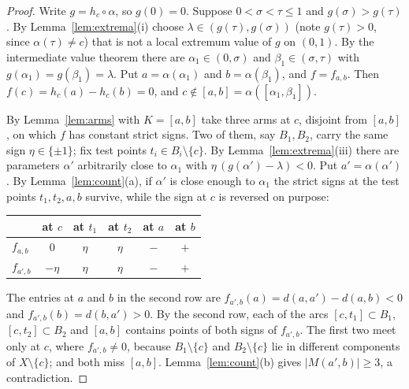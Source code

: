 \documentclass[11pt]{amsart}
\theoremstyle{definition}
\theoremstyle{remark}
\newcommand{\M}{M}
\begin{document}
\begin{proof}
Write $g=h_c\circ\alpha$, so $g(0)=0$. Suppose $0<\sigma<\tau\le1$ and $g(\sigma)>g(\tau)$. By Lemma~\ref{lem:extrema}(i) choose $\lambda\in(g(\tau),g(\sigma))$ (note $g(\tau)>0$, since $\alpha(\tau)\ne c$) that is not a local extremum value of $g$ on $(0,1)$. By the intermediate value theorem there are $\alpha_1\in(0,\sigma)$ and $\beta_1\in(\sigma,\tau)$ with $g(\alpha_1)=g(\beta_1)=\lambda$. Put $a=\alpha(\alpha_1)$ and $b=\alpha(\beta_1)$, and $f=f_{a,b}$. Then $f(c)=h_c(a)-h_c(b)=0$, and $c\notin[a,b]=\alpha([\alpha_1,\beta_1])$.

By Lemma~\ref{lem:arms} with $K=[a,b]$ take three arms at $c$, disjoint from $[a,b]$, on which $f$ has constant strict signs. Two of them, say $B_1,B_2$, carry the same sign $\eta\in\{\pm1\}$; fix test points $t_i\in B_i\setminus\{c\}$. By Lemma~\ref{lem:extrema}(iii) there are parameters $\alpha'$ arbitrarily close to $\alpha_1$ with $\eta\,(g(\alpha')-\lambda)<0$. Put $a'=\alpha(\alpha')$. By Lemma~\ref{lem:count}(a), if $\alpha'$ is close enough to $\alpha_1$ the strict signs at the test points $t_1,t_2,a,b$ survive, while the sign at $c$ is reversed on purpose:
\begin{center}
\small
\begin{tabular}{@{}lccccc@{}}
\toprule
 & at $c$ & at $t_1$ & at $t_2$ & at $a$ & at $b$\\
\midrule
$f_{a,b}$ & $0$ & $\eta$ & $\eta$ & $-$ & $+$\\
$f_{a',b}$ & $-\eta$ & $\eta$ & $\eta$ & $-$ & $+$\\
\bottomrule
\end{tabular}
\end{center}
The entries at $a$ and $b$ in the second row are $f_{a',b}(a)=d(a,a')-d(a,b)<0$ and $f_{a',b}(b)=d(b,a')>0$. By the second row, each of the arcs $[c,t_1]\subset B_1$, $[c,t_2]\subset B_2$ and $[a,b]$ contains points of both signs of $f_{a',b}$. The first two meet only at $c$, where $f_{a',b}\ne0$, because $B_1\setminus\{c\}$ and $B_2\setminus\{c\}$ lie in different components of $X\setminus\{c\}$; and both miss $[a,b]$. Lemma~\ref{lem:count}(b) gives $|\M(a',b)|\ge3$, a contradiction.
\end{proof}
\end{document}
